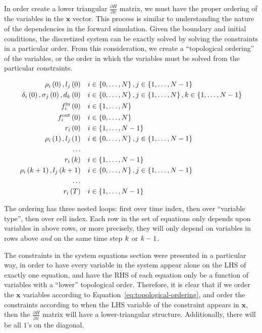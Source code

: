 \label{sec:ordering}

In order create a lower triangular $\frac{\partial H}{\partial x}$
matrix, we must have the proper ordering of the variables in the $\mathbf{x}$
vector. This process is similar to understanding the nature of the
dependencies in the forward simulation. Given the boundary and initial
conditions, the discretized system can be exactly solved by solving
the constraints in a particular order. From this consideration, we
create a ``topological ordering'' of the variables, or the order
in which the variables must be solved from the particular constraints.

\begin{align}
\rho_{i}\left(0\right),l_{j}\left(0\right) & & & i\in\left\{ 0,\ldots,N\right\} ,j\in\left\{ 1,\ldots,N-1\right\} \nonumber \\
\delta_{i}\left(0\right),\sigma_{j}\left(0\right),d_{k}\left(0\right) & & & i\in\left\{ 0,\ldots,N\right\} ,j\in\left\{ 1,\ldots,N\right\} ,k\in\left\{ 1,\ldots,N-1\right\} \nonumber \\
f_{i}^{\text{in}}\left(0\right) & & & i\in\left\{ 1,\ldots,N\right\} \nonumber \\
f_{i}^{\text{out}}\left(0\right) & & & i\in\left\{ 0,\ldots,N\right\} \nonumber \\
r_{i}\left(0\right) & & & i\in\left\{ 1,\ldots,N-1\right\} \nonumber \\
\rho_{i}\left(1\right),l_{j}\left(1\right) & & & i\in\left\{ 0,\ldots,N\right\} ,j\in\left\{ 1,\ldots,N-1\right\} \nonumber \\
\ldots\nonumber \\
r_{i}\left(k\right) & & & i\in\left\{ 1,\ldots,N-1\right\} \nonumber \\
\rho_{i}\left(k+1\right),l_{j}\left(k+1\right) & & & i\in\left\{ 0,\ldots,N\right\} ,j\in\left\{ 1,\ldots,N-1\right\} \label{eq:topological-ordering}\\
\ldots\nonumber \\
r_{i}\left(T\right) & & & i\in\left\{ 1,\ldots,N-1\right\} \nonumber 
\end{align}


The ordering has three nested loops: first over time index, then over ``variable type'', then over cell index. Each row in the set of equations only depends upon variables in above
rows, or more precisely, they will only depend on variables in rows
above \emph{and} on the same time step $k$ or $k-1$.

The constraints in the system equations section were presented in
a particular way, in order to have every variable in the system appear
alone on the LHS of exactly one equation, and have the RHS of each
equation only be a function of variables with a ``lower'' topological
order. Therefore, it is clear that if we order the $\mathbf{x}$ variables
according to Equation~\ref{eq:topological-ordering}, and order the
constraints according to when the LHS variable of the constraint appears
in $\mathbf{x}$, then the $\frac{\partial H}{\partial x}$ matrix
will have a lower-triangular structure. Additionally, there will be
all $1$'s on the diagonal.

